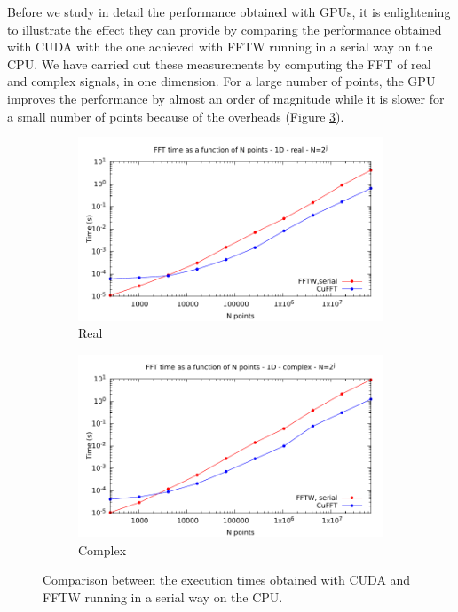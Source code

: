 \documentclass[12pt, a4paper]{article}
\begin{document}
Before we study in detail the performance obtained with GPUs, it is enlightening to illustrate the effect they can provide by comparing the performance obtained with CUDA with the one achieved with FFTW running in a serial way on the CPU. We have carried out these measurements by computing the FFT of real and complex signals, in one dimension. For a large number of points, the GPU improves the performance by almost an order of magnitude while it is slower for a small number of points because of the overheads (Figure \ref{COMPGPUCPU}).
\begin{figure}[H]
\captionsetup{width=0.8\linewidth}
\centering
\begin{subfigure}{.5\textwidth}
\centering
\includegraphics[width=.9\linewidth]{graphs/gpucpucomparison-r.pdf}
\caption{Real}
\label{PRODR}
\end{subfigure}%
\begin{subfigure}{.5\textwidth}
\centering
\includegraphics[width=.9\linewidth]{graphs/gpucpucomparison-c.pdf}
\caption{Complex}
\label{PRODC}
\end{subfigure}
\caption{Comparison between the execution times obtained with CUDA and FFTW running in a serial way on the CPU.}
\label{COMPGPUCPU}
\end{figure}
\end{document}
